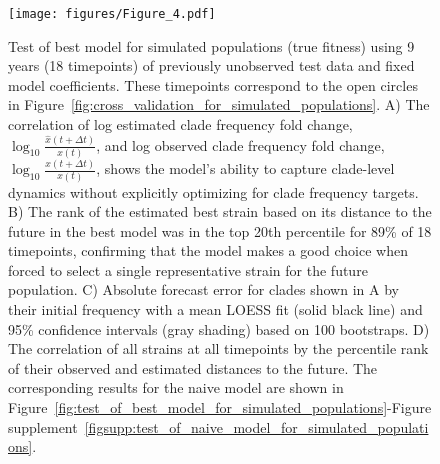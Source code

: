\begin{figure}
  \texttt{[image: figures/Figure\_4.pdf]}
  \caption{
  Test of best model for simulated populations (true fitness) using 9 years (18 timepoints) of previously unobserved test data and fixed model coefficients.
  These timepoints correspond to the open circles in Figure~\ref{fig:cross_validation_for_simulated_populations}.
  A) The correlation of log estimated clade frequency fold change, $\log_{10}{\frac{\hat{x}(t + \Delta{t})}{x(t)}}$, and log observed clade frequency fold change, $\log_{10}{\frac{x(t + \Delta{t})}{x(t)}}$, shows the model's ability to capture clade-level dynamics without explicitly optimizing for clade frequency targets.
  B) The rank of the estimated best strain based on its distance to the future in the best model was in the top 20th percentile for 89\% of 18 timepoints, confirming that the model makes a good choice when forced to select a single representative strain for the future population.
  C) Absolute forecast error for clades shown in A by their initial frequency with a mean LOESS fit (solid black line) and 95\% confidence intervals (gray shading) based on 100 bootstraps.
  D) The correlation of all strains at all timepoints by the percentile rank of their observed and estimated distances to the future.
  The corresponding results for the naive model are shown in Figure~\ref{fig:test_of_best_model_for_simulated_populations}-Figure supplement~\ref{figsupp:test_of_naive_model_for_simulated_populations}.
  }
  \label{fig:test_of_best_model_for_simulated_populations}

  \label{figsupp:validation_of_best_model_for_simulated_populations}


\end{figure}
